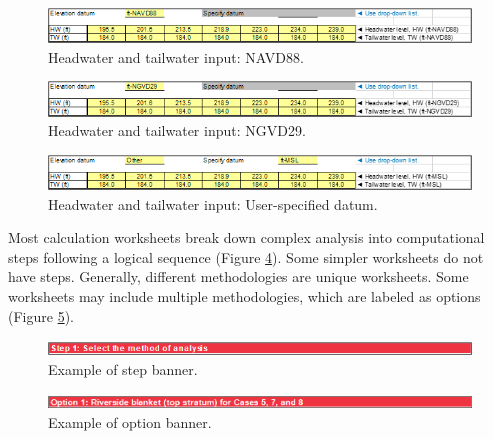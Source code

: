 \documentclass[
]{book}
\begin{document}
\begin{figure}

{\centering \includegraphics{images/figure3} 

}

\caption{Headwater and tailwater input: NAVD88.}\label{fig:figure-3}
\end{figure}

\begin{figure}

{\centering \includegraphics{images/figure4} 

}

\caption{Headwater and tailwater input: NGVD29.}\label{fig:figure-4}
\end{figure}

\begin{figure}

{\centering \includegraphics{images/figure5} 

}

\caption{Headwater and tailwater input: User-specified datum.}\label{fig:figure-5}
\end{figure}

Most calculation worksheets break down complex analysis into computational steps following a logical sequence (Figure \ref{fig:figure-6}). Some simpler worksheets do not have steps. Generally, different methodologies are unique worksheets. Some worksheets may include multiple methodologies, which are labeled as options (Figure \ref{fig:figure-7}).

\begin{figure}

{\centering \includegraphics{images/figure6} 

}

\caption{Example of step banner.}\label{fig:figure-6}
\end{figure}

\begin{figure}

{\centering \includegraphics{images/figure7} 

}

\caption{Example of option banner.}\label{fig:figure-7}
\end{figure}
\end{document}
